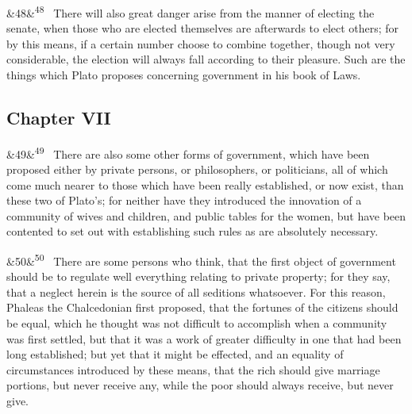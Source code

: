 \documentclass[12pt]{article}
\newcommand{\para}[1][]{\par\noindent\ifx&#1&\else\textsuperscript{\footnotesize #1}~\fi}
\begin{document}
\para[48] There will also great danger arise from the manner of electing the senate, when those who are elected themselves are afterwards to elect others; for by this means, if a certain number choose to combine together, though not very considerable, the election will always fall according to their pleasure. Such are the things which Plato proposes concerning government in his book of Laws.

\subsection*{Chapter VII}

\para[49] There are also some other forms of government, which have been proposed either by private persons, or philosophers, or politicians, all of which come much nearer to those which have been really established, or now exist, than these two of Plato's; for neither have they introduced the innovation of a community of wives and children, and public tables for the women, but have been contented to set out with establishing such rules as are absolutely necessary.

\para[50] There are some persons who think, that the first object of government should be to regulate well everything relating to private property; for they say, that a neglect herein is the source of all seditions whatsoever. For this reason, Phaleas the Chalcedonian first proposed, that the fortunes of the citizens should be equal, which he thought was not difficult to accomplish when a community was first settled, but that it was a work of greater difficulty in one that had been long established; but yet that it might be effected, and an equality of circumstances introduced by these means, that the rich should give marriage portions, but never receive any, while the poor should always receive, but never give.
\end{document}
